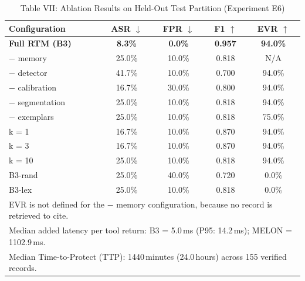 \begin{table}[t]
\centering
\caption{Table VII: Ablation Results on Held-Out Test Partition (Experiment E6)}
\begin{tabular}{l c c c c}
\hline
\textbf{Configuration} & \textbf{ASR} $\downarrow$ & \textbf{FPR} $\downarrow$ & \textbf{F1} $\uparrow$ & \textbf{EVR} $\uparrow$ \\
\hline
\textbf{Full RTM (B3)} & \textbf{8.3\%} & \textbf{0.0\%} & \textbf{0.957} & \textbf{94.0\%} \\
− memory & 25.0\% & 10.0\% & 0.818 & N/A \\
− detector & 41.7\% & 10.0\% & 0.700 & 94.0\% \\
− calibration & 16.7\% & 30.0\% & 0.800 & 94.0\% \\
− segmentation & 25.0\% & 10.0\% & 0.818 & 94.0\% \\
− exemplars & 25.0\% & 10.0\% & 0.818 & 75.0\% \\
k = 1 & 16.7\% & 10.0\% & 0.870 & 94.0\% \\
k = 3 & 16.7\% & 10.0\% & 0.870 & 94.0\% \\
k = 10 & 25.0\% & 10.0\% & 0.818 & 94.0\% \\
B3-rand & 25.0\% & 40.0\% & 0.720 & 0.0\% \\
B3-lex & 25.0\% & 10.0\% & 0.818 & 0.0\% \\
\hline
\multicolumn{5}{l}{\small EVR is not defined for the $-$ memory configuration, because no record is retrieved to cite.} \\
\multicolumn{5}{l}{\small Median added latency per tool return: B3 = 5.0\,ms (P95: 14.2\,ms); MELON = 1102.9\,ms.} \\
\multicolumn{5}{l}{\small Median Time-to-Protect (TTP): 1440\,minutes (24.0\,hours) across 155 verified records.} \\
\hline
\end{tabular}
\end{table}
